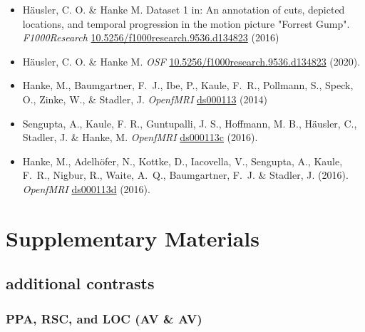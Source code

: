 \documentclass[english]{article}
\begin{document}
\begin{itemize}
\item Häusler, C. O. \& Hanke M. Dataset 1 in: An annotation of cuts, depicted
locations, and temporal progression in the motion picture "Forrest Gump".
\emph{F1000Research}
\href{https://doi.org/10.5256/f1000research.9536.d134823}{10.5256/f1000research.9536.d134823}
(2016)

\item Häusler, C. O. \& Hanke M. \emph{OSF}
\href{https://doi.org/10.17605/OSF.IO/GFRME}{10.5256/f1000research.9536.d134823}
(2020).

\item Hanke, M., Baumgartner, F.~J., Ibe, P., Kaule, F.~R., Pollmann, S., Speck, O.,
  Zinke, W., \& Stadler, J. \emph{OpenfMRI} \href{https://openfmri.org/dataset/ds000113}{ds000113} (2014)

\item Sengupta, A., Kaule, F. R., Guntupalli, J. S., Hoffmann, M. B., Häusler, C., Stadler, J. \& Hanke, M.
  \emph{OpenfMRI} \href{https://openfmri.org/dataset/ds000113c}{ds000113c} (2016).

\item Hanke, M., Adelhöfer, N., Kottke, D., Iacovella, V., Sengupta, A., Kaule, F.~R., Nigbur, R., Waite, A.~Q.,
  Baumgartner, F.~J. \& Stadler, J. (2016).
  \emph{OpenfMRI} \href{https://openfmri.org/dataset/ds000113d}{ds000113d} (2016).
\end{itemize}


\appendix

\pagebreak[4]

\setcounter{figure}{0}
\makeatletter
\renewcommand{\thefigure}{S\@arabic\c@figure}
\makeatother

\section{Supplementary Materials}


\subsection{additional contrasts}



\subsubsection{PPA, RSC, and LOC (AV \& AV)}
\end{document}
